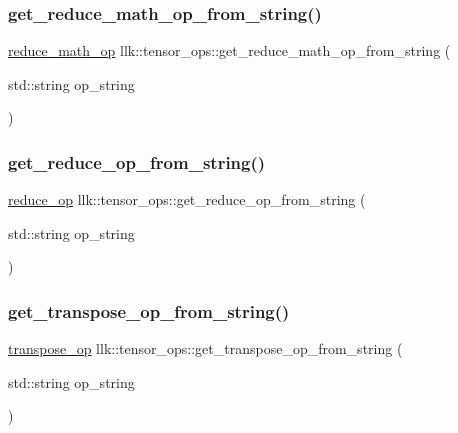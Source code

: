 \subsubsection{\texorpdfstring{get\+\_\+reduce\+\_\+math\+\_\+op\+\_\+from\+\_\+string()}{get\_reduce\_math\_op\_from\_string()}}
{\footnotesize\ttfamily \hyperlink{namespacellk_1_1tensor__ops_abbf479560e4c31bec0b83feb6531552c}{reduce\+\_\+math\+\_\+op} llk\+::tensor\+\_\+ops\+::get\+\_\+reduce\+\_\+math\+\_\+op\+\_\+from\+\_\+string (\begin{DoxyParamCaption}\item[{std\+::string}]{op\+\_\+string }\end{DoxyParamCaption})}

\mbox{\label{namespacellk_1_1tensor__ops_afcefdc3151ece6e39e2cb451268e85ac}} 
\subsubsection{\texorpdfstring{get\+\_\+reduce\+\_\+op\+\_\+from\+\_\+string()}{get\_reduce\_op\_from\_string()}}
{\footnotesize\ttfamily \hyperlink{namespacellk_1_1tensor__ops_a57720b85adbe1e9b3bbab02b985f0d8d}{reduce\+\_\+op} llk\+::tensor\+\_\+ops\+::get\+\_\+reduce\+\_\+op\+\_\+from\+\_\+string (\begin{DoxyParamCaption}\item[{std\+::string}]{op\+\_\+string }\end{DoxyParamCaption})}

\mbox{\label{namespacellk_1_1tensor__ops_af559d533a9e952194483605bfd11d59e}} 
\subsubsection{\texorpdfstring{get\+\_\+transpose\+\_\+op\+\_\+from\+\_\+string()}{get\_transpose\_op\_from\_string()}}
{\footnotesize\ttfamily \hyperlink{namespacellk_1_1tensor__ops_a3a9aca203c5d38260a1dd35253d57ee8}{transpose\+\_\+op} llk\+::tensor\+\_\+ops\+::get\+\_\+transpose\+\_\+op\+\_\+from\+\_\+string (\begin{DoxyParamCaption}\item[{std\+::string}]{op\+\_\+string }\end{DoxyParamCaption})}

